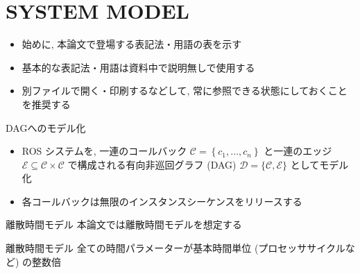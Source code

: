 
\section{SYSTEM MODEL}
\label{sec: system model}


\begin{frame}{}
    \begin{itemize}
        \item 始めに, 本論文で登場する表記法・用語の表を示す
        \item 基本的な表記法・用語は資料中で説明無しで使用する
        \item 別ファイルで開く・印刷するなどして, 常に参照できる状態にしておくことを推奨する
    \end{itemize}
\end{frame}



\begin{frame}{DAGへのモデル化}
    \begin{itemize}
        \item ROS システムを, 一連のコールバック $\mathcal{C}=\left\{c_{1}, \ldots, c_{n}\right\}$ と一連のエッジ $\mathcal{E} \subseteq \mathcal{C} \times \mathcal{C}$ で構成される有向非巡回グラフ (DAG) $\mathcal{D}=\{\mathcal{C}, \mathcal{E}\}$ としてモデル化
        \item 各コールバックは無限のインスタンスシーケンスをリリースする
    \end{itemize}
\end{frame}

\begin{frame}{離散時間モデル}
    本論文では離散時間モデルを想定する
    \begin{block}{離散時間モデル}
        全ての時間パラメーターが基本時間単位 (プロセッササイクルなど) の整数倍
    \end{block}
\end{frame}

